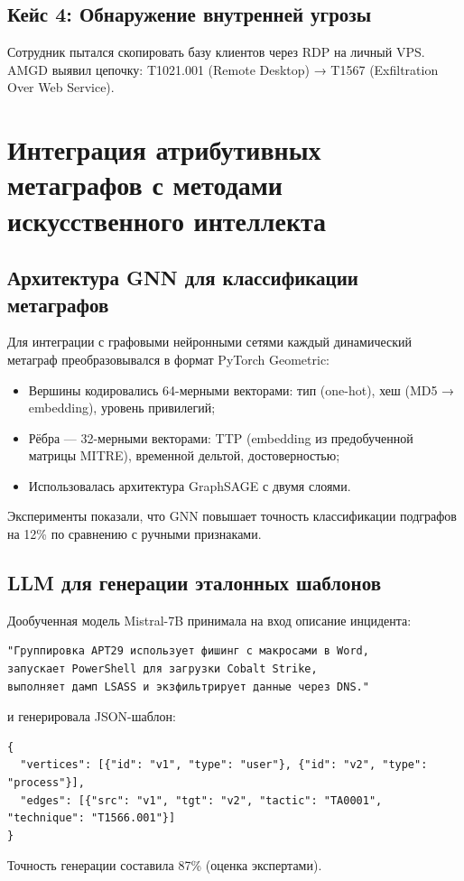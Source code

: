 \subsection{Кейс 4: Обнаружение внутренней угрозы}

Сотрудник пытался скопировать базу клиентов через RDP на личный VPS.  
AMGD выявил цепочку:  
T1021.001 (Remote Desktop) → T1567 (Exfiltration Over Web Service).

\section{Интеграция атрибутивных метаграфов с методами искусственного интеллекта}\label{sec:ch4/sect6}

\subsection{Архитектура GNN для классификации метаграфов}

Для интеграции с графовыми нейронными сетями каждый динамический метаграф преобразовывался в формат PyTorch Geometric:
\begin{itemize}
    \item Вершины кодировались 64-мерными векторами: тип (one-hot), хеш (MD5 → embedding), уровень привилегий;
    \item Рёбра — 32-мерными векторами: TTP (embedding из предобученной матрицы MITRE), временной дельтой, достоверностью;
    \item Использовалась архитектура GraphSAGE с двумя слоями.
\end{itemize}

Эксперименты показали, что GNN повышает точность классификации подграфов на 12\% по сравнению с ручными признаками.

\subsection{LLM для генерации эталонных шаблонов}

Дообученная модель Mistral-7B принимала на вход описание инцидента:
\begin{verbatim}
"Группировка APT29 использует фишинг с макросами в Word, 
запускает PowerShell для загрузки Cobalt Strike, 
выполняет дамп LSASS и экзфильтрирует данные через DNS."
\end{verbatim}
и генерировала JSON-шаблон:
\begin{verbatim}
{
  "vertices": [{"id": "v1", "type": "user"}, {"id": "v2", "type": "process"}],
  "edges": [{"src": "v1", "tgt": "v2", "tactic": "TA0001", "technique": "T1566.001"}]
}
\end{verbatim}
Точность генерации составила 87\% (оценка экспертами).

